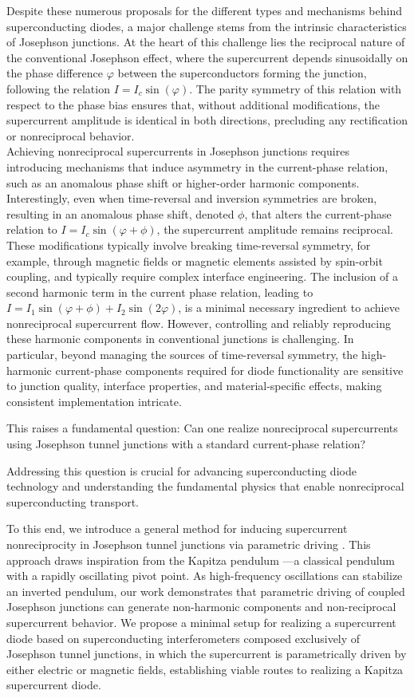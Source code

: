 \documentclass[prl,twocolumn,superscriptaddress,showpacs,nofootinbib]{revtex4-2}
\begin{document}
Despite these numerous proposals for the different types and mechanisms behind superconducting diodes, a major challenge stems from the intrinsic characteristics of Josephson junctions.
At the heart of this challenge lies the reciprocal nature of the conventional Josephson effect, where the supercurrent depends sinusoidally on the phase difference $\varphi$ between the superconductors forming the junction, following the relation $I = I_c \sin(\varphi)$.
The parity symmetry of this relation with respect to the phase bias ensures that, without additional modifications, the supercurrent amplitude is identical in both directions, precluding any rectification or nonreciprocal behavior.
\\
Achieving nonreciprocal supercurrents in Josephson junctions requires introducing mechanisms that induce asymmetry in the current-phase relation, such as an anomalous phase shift or higher-order harmonic components. Interestingly, even when time-reversal and inversion symmetries are broken, resulting in an anomalous phase shift, denoted $\phi$, that alters the current-phase relation to $I = I_c \sin(\varphi + \phi)$, the supercurrent amplitude remains reciprocal. These modifications typically involve breaking time-reversal symmetry, for example, through magnetic fields or magnetic elements assisted by spin-orbit coupling, and typically require complex interface engineering.
The inclusion of a second harmonic term in the current phase relation, leading to $I = I_{1} \sin(\varphi + \phi)+I_{2} \sin(2 \varphi)$, is a minimal necessary ingredient to achieve nonreciprocal supercurrent flow.
However, controlling and reliably reproducing these harmonic components in conventional junctions is challenging. In particular, beyond managing the sources of time-reversal symmetry, the high-harmonic current-phase components required for diode functionality are sensitive to junction quality, interface properties, and material-specific effects, making consistent implementation intricate.


This raises a fundamental question: Can one realize nonreciprocal supercurrents using Josephson tunnel junctions with a standard current-phase relation?

Addressing this question is crucial for advancing superconducting diode technology and understanding the fundamental physics that enable nonreciprocal superconducting transport.


To this end, we introduce a general method for inducing supercurrent nonreciprocity in Josephson tunnel junctions via parametric driving \cite{eichler2023classical}. This approach draws inspiration from the Kapitza pendulum \cite{Kapitza_1951, Kapitsa_1951_ufn}—a classical pendulum with a rapidly oscillating pivot point. As high-frequency oscillations can stabilize an inverted pendulum, our work demonstrates that parametric driving of coupled Josephson junctions can generate non-harmonic components and non-reciprocal supercurrent behavior.
We propose a minimal setup for realizing a supercurrent diode based on superconducting interferometers composed exclusively of Josephson tunnel junctions, in which the supercurrent is parametrically driven by either electric or magnetic fields, establishing viable routes to realizing a Kapitza supercurrent diode.
\end{document}
